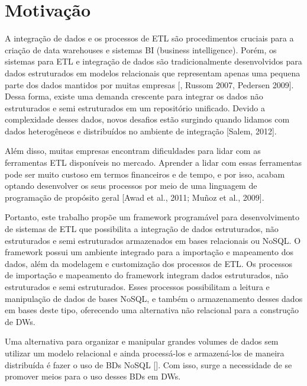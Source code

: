 %

\section{Motivação}

A integração de dados e os processos de ETL são procedimentos cruciais para a criação de data warehouses e sistemas BI (business intelligence). Porém, os sistemas para ETL e integração de dados são tradicionalmente desenvolvidos para dados estruturados em modelos relacionais que representam apenas uma pequena parte dos dados mantidos por muitas empresas [\cite{darmont:2005}, Russom 2007, Pedersen 2009]. Dessa forma, existe uma demanda crescente para integrar os dados não estruturados e semi estruturados em um repositório unificado. Devido a complexidade desses dados, novos desafios estão surgindo quando lidamos com dados heterogêneos e distribuídos no ambiente de integração [Salem, 2012].

Além disso, muitas empresas encontram dificuldades para lidar com as ferramentas ETL disponíveis no mercado. Aprender a lidar com essas ferramentas pode ser muito custoso em termos financeiros e de tempo, e por isso, acabam optando desenvolver os seus processos por meio de uma linguagem de programação de propósito geral [Awad et al., 2011; Muñoz et al., 2009].

Portanto, este trabalho propõe um framework programável para desenvolvimento de sistemas de ETL que possibilita a integração de dados estruturados, não estruturados e semi estruturados armazenados em bases relacionais ou NoSQL. O framework possui um ambiente integrado para a importação e mapeamento dos dados, além da modelagem e customização dos processos de ETL. Os processos de importação e mapeamento do framework integram dados estruturados, não estruturados e semi estruturados. Esses processos possibilitam a leitura e manipulação de dados de bases NoSQL, e também o armazenamento desses dados em bases deste tipo, oferecendo uma alternativa não relacional para a construção de DWs.

Uma alternativa para organizar e manipular grandes volumes de dados sem utilizar um modelo relacional e ainda processá-los e armazená-los de maneira distribuída é fazer o uso de BDs NoSQL [\cite{scabora:2016}]. Com isso, surge a necessidade de se promover meios para o uso desses BDs em DWs. 

